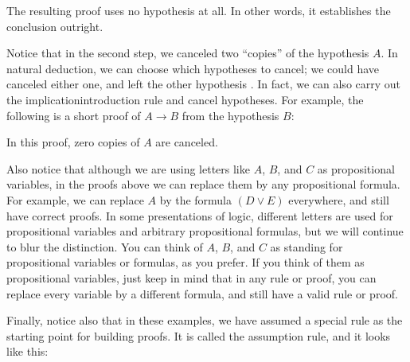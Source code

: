 \documentclass[letterpaper,10pt,english]{sphinxmanual}
\begin{document}
\begin{center}
\AXM{}
\AXM{}
\AXM{}
\AXM{}
\DP
\end{center}

\sphinxAtStartPar
The resulting proof uses no hypothesis at all. In other words, it establishes the conclusion outright.

\sphinxAtStartPar
Notice that in the second step, we canceled two “copies” of the hypothesis \(A\). In natural deduction, we can choose which hypotheses to cancel; we could have canceled either one, and left the other hypothesis . In fact, we can also carry out the implication\sphinxhyphen{}introduction rule and cancel  hypotheses. For example, the following is a short proof of \(A \to B\) from the hypothesis \(B\):



\begin{center}
\DP
\end{center}

\sphinxAtStartPar
In this proof, zero copies of \(A\) are canceled.

\sphinxAtStartPar
Also notice that although we are using letters like \(A\), \(B\), and \(C\) as propositional variables, in the proofs above we can replace them by any propositional formula. For example, we can replace \(A\) by the formula \((D \vee E)\) everywhere, and still have correct proofs. In some presentations of logic, different letters are used for propositional variables and arbitrary propositional formulas, but we will continue to blur the distinction. You can think of \(A\), \(B\), and \(C\) as standing for propositional variables or formulas, as you prefer. If you think of them as propositional variables, just keep in mind that in any rule or proof, you can replace every variable by a different formula, and still have a valid rule or proof.

\sphinxAtStartPar
Finally, notice also that in these examples, we have assumed a special rule as the starting point for building proofs. It is called the assumption rule, and it looks like this:



\begin{center}
\DP
\end{center}
\end{document}
